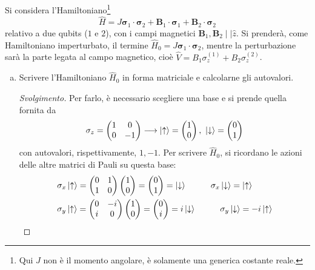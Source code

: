 \documentclass[11pt, a4paper]{scrartcl} %
\numberwithin{equation}{subsection}
\theoremstyle{style2}
\theoremstyle{style1}
\renewcommand\qedsymbol{$\blacksquare$}
\newenvironment{svolgimento}{\renewcommand\qedsymbol{$\spadesuit$}\begin{proof}[Svolgimento]}{\end{proof}}
\begin{document}
Si considera l'Hamiltoniano\footnote{Qui $J$ non \`e il momento angolare, \`e solamente una generica costante reale.}
\begin{equation}
	\hat{H} = J \pmb{\sigma } _1 \cdot \pmb{\sigma } _2 + \mathbf{B} _1 \cdot \pmb{\sigma } _1 + \mathbf{B} _2 \cdot \pmb{\sigma } _2
\end{equation}
relativo a due qubits ($1$ e $2$), con i campi magnetici $\mathbf{B} _1, \mathbf{B} _2  \mid \mid  \hat{z}$.
Si prender\`a, come Hamiltoniano imperturbato, il termine $\hat{H}_0 = J \pmb{\sigma } _1 \cdot \pmb{\sigma } _2 $, mentre la perturbazione sar\`a la parte legata al campo magnetico, cio\`e $\hat{V} = B_1 \sigma ^{(1)} _z + B_2 \sigma ^{(2)} _z$.
\begin{enumerate}[(a).]
	\item Scrivere l'Hamiltoniano $\hat{H}_0$ in forma matriciale e calcolarne gli autovalori.
		\begin{svolgimento}
			Per farlo, \`e necessario scegliere una base e si prende quella fornita da
			\[
				\sigma _z = \begin{pmatrix} 1 & 0 \\ 0 & - 1 \end{pmatrix} \longrightarrow \ket{\uparrow}=  \begin{pmatrix} 1 \\0  \end{pmatrix} , \ \ket{\downarrow} = \begin{pmatrix} 0 \\ 1 \end{pmatrix} 
			\] 
		con autovalori, rispettivamente, $1, -1$.
		Per scrivere $\hat{H}_0$, si ricordano le azioni delle altre matrici di Pauli su questa base:
		\[
		\begin{split}
			&\sigma _x \ket{\uparrow}  = \begin{pmatrix} 0 & 1 \\ 1 & 0  \end{pmatrix} \begin{pmatrix} 1 \\0  \end{pmatrix} = \begin{pmatrix} 0 \\1 \end{pmatrix} = \ket{\downarrow} \hspace{1cm} \sigma _x \ket{\downarrow} = \ket{\uparrow} \\
			& \sigma _y \ket{\uparrow} = \begin{pmatrix} 0 & -i \\ i & 0  \end{pmatrix} \begin{pmatrix} 1 \\0  \end{pmatrix} = \begin{pmatrix} 0 \\ i \end{pmatrix} =i \ket{\downarrow} \hspace{1cm} \sigma _y \ket{\downarrow} = - i \ket{\uparrow} 

\end{split}\]
\end{svolgimento}
\end{enumerate}
\end{document}
